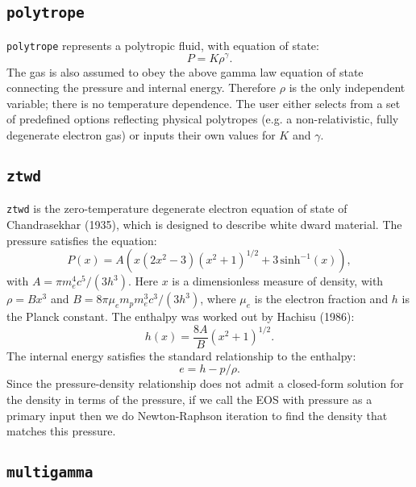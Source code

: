 \subsection{\tt polytrope} 

{\tt polytrope} represents a polytropic fluid, with equation of
  state:
\begin{equation}
  P = K \rho^\gamma.
\end{equation}
The gas is also assumed to obey the above gamma law equation of state
connecting the pressure and internal energy. Therefore $\rho$ is the
only independent variable; there is no temperature dependence. The
user either selects from a set of predefined options reflecting
physical polytropes (e.g. a non-relativistic, fully degenerate
electron gas) or inputs their own values for $K$ and $\gamma$.



\subsection{\tt ztwd} 

{\tt ztwd} is the zero-temperature degenerate electron equation
  of state of Chandrasekhar (1935), which is designed to describe
  white dward material. The pressure satisfies the equation:
\begin{equation}
  P(x) = A \left( x(2x^2-3)(x^2 + 1)^{1/2} + 3\, \text{sinh}^{-1}(x) \right),
\end{equation}
with $A = \pi m_e^4 c^5 / (3 h^3)$. Here $x$ is a dimensionless
measure of density, with $\rho = B x^3$ and $B = 8\pi \mu_e m_p m_e^3
c^3 / (3h^3)$, where $\mu_e$ is the electron fraction and $h$ is the
Planck constant. The enthalpy was worked out by Hachisu (1986):
\begin{equation}
  h(x) = \frac{8A}{B}\left(x^2 + 1\right)^{1/2}.
\end{equation}
The internal energy satisfies the standard relationship to the enthalpy:
\begin{equation}
  e = h - p / \rho.
\end{equation}
Since the pressure-density relationship does not admit a closed-form
solution for the density in terms of the pressure, if we call the EOS
with pressure as a primary input then we do Newton-Raphson iteration
to find the density that matches this pressure.


\subsection{\tt multigamma} 

